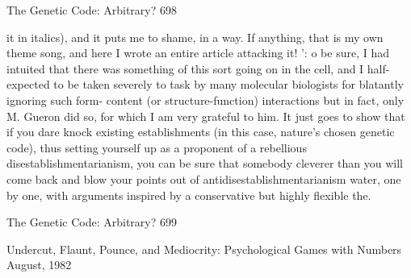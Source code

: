 The Genetic Code: Arbitrary?                                                             698

it in italics), and it puts me to shame, in a way. If anything, that is my own theme
song, and here I wrote an entire article attacking it! ': o be sure, I had intuited that
there was something of this sort going on in the cell, and I half-expected to be taken
severely to task by many molecular biologists for blatantly ignoring such form-
content (or structure-function) interactions but in fact, only M. Gueron did so, for
which I am very grateful to him.
         It just goes to show that if you dare knock existing establishments (in this case,
nature's chosen genetic code), thus setting yourself up as a proponent of a rebellious
disestablishmentarianism, you can be sure that somebody cleverer than you will come
back and blow your points out of antidisestablishmentarianism water, one by one,
with arguments inspired by a conservative but highly flexible the.




The Genetic Code: Arbitrary?                                                           699


                 Undercut, Flaunt, Pounce, and
                Mediocrity: Psychological Games
                         with Numbers
                                     August, 1982


